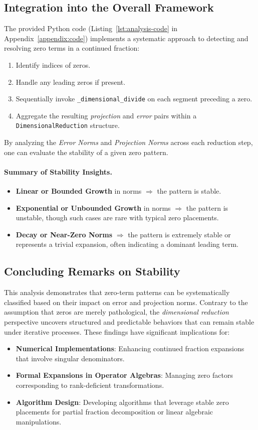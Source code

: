 \subsection{Integration into the Overall Framework}
The provided Python code (Listing~\ref{lst:analysis-code} in Appendix~\ref{appendix:code}) implements a systematic approach to detecting and resolving zero terms in a continued fraction:
\begin{enumerate}
    \item Identify indices of zeros.
    \item Handle any leading zeros if present.
    \item Sequentially invoke \texttt{\_dimensional\_divide} on each segment preceding a zero.
    \item Aggregate the resulting \emph{projection} and \emph{error} pairs within a \texttt{DimensionalReduction} structure.
\end{enumerate}
By analyzing the \emph{Error Norms} and \emph{Projection Norms} across each reduction step, one can evaluate the stability of a given zero pattern.

\paragraph{Summary of Stability Insights.}
\begin{itemize}
    \item \textbf{Linear or Bounded Growth} in norms \(\Rightarrow\) the pattern is stable.
    \item \textbf{Exponential or Unbounded Growth} in norms \(\Rightarrow\) the pattern is unstable, though such cases are rare with typical zero placements.
    \item \textbf{Decay or Near-Zero Norms} \(\Rightarrow\) the pattern is extremely stable or represents a trivial expansion, often indicating a dominant leading term.
\end{itemize}

\subsection{Concluding Remarks on Stability}
This analysis demonstrates that zero-term patterns can be systematically classified based on their impact on error and projection norms. Contrary to the assumption that zeros are merely pathological, the \emph{dimensional reduction} perspective uncovers structured and predictable behaviors that can remain stable under iterative processes. These findings have significant implications for:
\begin{itemize}
  \item \textbf{Numerical Implementations}: Enhancing continued fraction expansions that involve singular denominators.
  \item \textbf{Formal Expansions in Operator Algebras}: Managing zero factors corresponding to rank-deficient transformations.
  \item \textbf{Algorithm Design}: Developing algorithms that leverage stable zero placements for partial fraction decomposition or linear algebraic manipulations.
\end{itemize}


